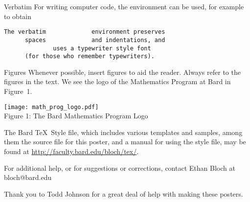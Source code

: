 \documentclass[12pt]{article}
\begin{document}
\begin{posterbard}
\begin{posterboxtitle}{Verbatim}
For writing computer code, the \verb@verbatim@ environment can be used, for example to obtain

\begin{verbatim}
The verbatim             environment preserves
      spaces             and indentations, and          
              uses a typewriter style font
      (for those who remember typewriters).
\end{verbatim}
\end{posterboxtitle}


\begin{posterboxtitle}{Figures}
Whenever possible, insert figures to aid the reader.  Always refer to the figures in the text.  We see the logo of the Mathematics Program at Bard in Figure~1.

\begin{center}
\texttt{[image: math\_prog\_logo.pdf]}\\
Figure 1: The Bard Mathematics Program Logo
\end{center}
\end{posterboxtitle}


\begin{posterboxnotitle}
The Bard \TeX\ Style file, which includes various templates and samples, among them the source file for this poster, and a manual for using the style file, may be found at \url{http://faculty.bard.edu/bloch/tex/}.
\bigskip

For additional help, or for suggestions or corrections,
contact Ethan Bloch at bloch@bard.edu
\bigskip

Thank you to Todd Johnson for a great deal of help with making these posters.
\end{posterboxnotitle}


\begin{bibliog}




\end{bibliog}

\end{posterbard}
\end{document}
